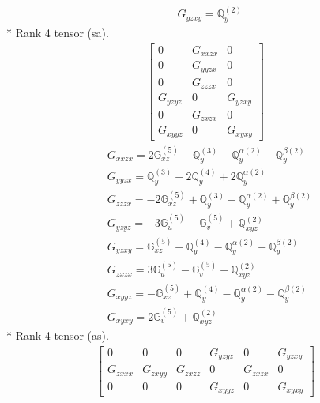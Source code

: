 \documentclass[fleqn,8pt,landscape]{jsarticle}
\begin{document}
\begin{align*}
& G_{yzxy} = \mathbb{Q}_{y}^{(2)}
\end{align*}
* Rank 4 tensor (sa).
\begin{align*}
\begin{bmatrix} 0 & G_{xxzx} & 0 \\ 0 & G_{yyzx} & 0 \\ 0 & G_{zzzx} & 0 \\ G_{yzyz} & 0 & G_{yzxy} \\ 0 & G_{zxzx} & 0 \\ G_{xyyz} & 0 & G_{xyxy} \end{bmatrix}
\end{align*}
\begin{align*}
& G_{xxzx} = 2 \mathbb{G}_{xz}^{(5)} + \mathbb{Q}_{y}^{(3)} - \mathbb{Q}_{y}^{\alpha(2)} - \mathbb{Q}_{y}^{\beta(2)} \\
& G_{yyzx} = \mathbb{Q}_{y}^{(3)} + 2 \mathbb{Q}_{y}^{(4)} + 2 \mathbb{Q}_{y}^{\alpha(2)} \\
& G_{zzzx} = - 2 \mathbb{G}_{xz}^{(5)} + \mathbb{Q}_{y}^{(3)} - \mathbb{Q}_{y}^{\alpha(2)} + \mathbb{Q}_{y}^{\beta(2)} \\
& G_{yzyz} = - 3 \mathbb{G}_{u}^{(5)} - \mathbb{G}_{v}^{(5)} + \mathbb{Q}_{xyz}^{(2)} \\
& G_{yzxy} = \mathbb{G}_{xz}^{(5)} + \mathbb{Q}_{y}^{(4)} - \mathbb{Q}_{y}^{\alpha(2)} + \mathbb{Q}_{y}^{\beta(2)} \\
& G_{zxzx} = 3 \mathbb{G}_{u}^{(5)} - \mathbb{G}_{v}^{(5)} + \mathbb{Q}_{xyz}^{(2)} \\
& G_{xyyz} = - \mathbb{G}_{xz}^{(5)} + \mathbb{Q}_{y}^{(4)} - \mathbb{Q}_{y}^{\alpha(2)} - \mathbb{Q}_{y}^{\beta(2)} \\
& G_{xyxy} = 2 \mathbb{G}_{v}^{(5)} + \mathbb{Q}_{xyz}^{(2)}
\end{align*}
* Rank 4 tensor (as).
\begin{align*}
\begin{bmatrix} 0 & 0 & 0 & G_{yzyz} & 0 & G_{yzxy} \\ G_{zxxx} & G_{zxyy} & G_{zxzz} & 0 & G_{zxzx} & 0 \\ 0 & 0 & 0 & G_{xyyz} & 0 & G_{xyxy} \end{bmatrix}
\end{align*}
\end{document}

